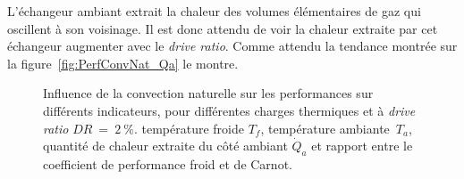 L'échangeur ambiant extrait la chaleur des volumes élémentaires de gaz qui oscillent à son voisinage. Il est donc attendu de voir la chaleur extraite par cet échangeur augmenter avec le \textit{drive ratio}. Comme attendu la tendance montrée sur la figure~\ref{fig:PerfConvNat_Qa} le montre. 


\begin{figure}[!ht]
    \centering
	\begin{subfigure}[b]{.48\textwidth}
		\centering
        
		\caption{}
		\label{fig:PerfConvNat_Tf_DR2}
	\end{subfigure}		
	\begin{subfigure}[b]{.48\textwidth}
		\centering
        
		\caption{}
		\label{fig:PerfConvNat_Ta_DR2}
	\end{subfigure}
	
	\begin{subfigure}[b]{.48\textwidth}
		\centering
        
		\caption{}
		\label{fig:PerfConvNat_Qa_DR2}
	\end{subfigure}	
	\begin{subfigure}[b]{.48\textwidth}
		\centering
        
		\caption{}
		\label{fig:PerfConvNat_COP_DR2}
	\end{subfigure}	      
    \caption{Influence de la convection naturelle sur les performances sur différents indicateurs, pour différentes charges thermiques et à \textit{drive ratio} $DR~=~\qty{2}{\percent}$.  température froide $T_f$,  température ambiante~$T_a$,  quantité de chaleur extraite du côté ambiant $\dot Q_a$ et  rapport entre le coefficient de performance froid et de Carnot. }
    \label{fig:PerfConvNat_DR2}
\end{figure}

